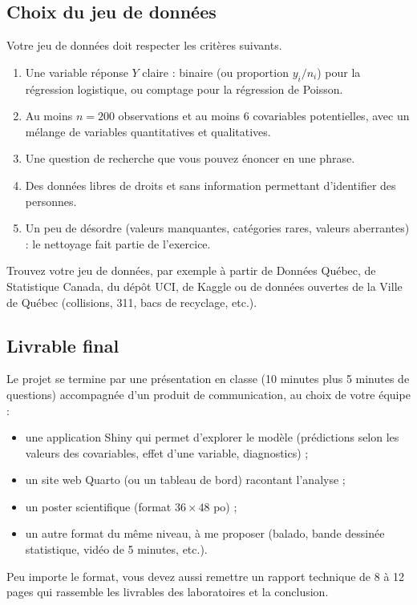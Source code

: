 \documentclass[11pt,letterpaper]{scrartcl}
\begin{document}
\subsection{Choix du jeu de données}

Votre jeu de données doit respecter les critères suivants.
\begin{enumerate}
  \item Une variable réponse $Y$ claire : binaire (ou proportion $y_i/n_i$) pour la régression logistique, ou comptage pour la régression de Poisson.
  \item Au moins $n = 200$ observations et au moins 6 covariables potentielles, avec un mélange de variables quantitatives et qualitatives.
  \item Une question de recherche que vous pouvez énoncer en une phrase.
  \item Des données libres de droits et sans information permettant d'identifier des personnes.
  \item Un peu de désordre (valeurs manquantes, catégories rares, valeurs aberrantes) : le nettoyage fait partie de l'exercice.
\end{enumerate}

Trouvez votre jeu de données, par exemple à partir de Données Québec, de Statistique Canada, du dépôt UCI, de Kaggle ou de données ouvertes de la Ville de Québec (collisions, 311, bacs de recyclage, etc.).

\subsection{Livrable final}

Le projet se termine par une présentation en classe (10 minutes plus 5 minutes de questions) accompagnée d'un produit de communication, au choix de votre équipe :
\begin{itemize}
  \item une application Shiny qui permet d'explorer le modèle (prédictions selon les valeurs des covariables, effet d'une variable, diagnostics) ;
  \item un site web Quarto (ou un tableau de bord) racontant l'analyse ;
  \item un poster scientifique (format $36 \times 48$ po) ;
  \item un autre format du même niveau, à me proposer (balado, bande dessinée statistique, vidéo de 5 minutes, etc.).
\end{itemize}

Peu importe le format, vous devez aussi remettre un rapport technique de 8 à 12 pages qui rassemble les livrables des laboratoires et la conclusion.
\end{document}
